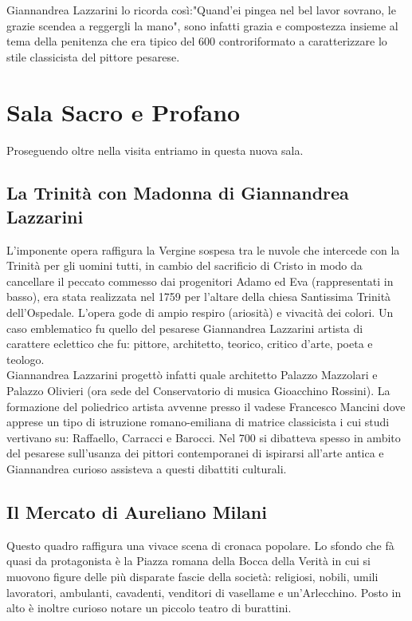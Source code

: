 \documentclass[hidelinks,12pt,a4paper]{article}
\begin{document}
\begin{flushleft}
		Giannandrea Lazzarini lo ricorda così:"Quand'ei pingea nel bel lavor sovrano, le grazie scendea a reggergli la mano", sono infatti grazia e compostezza insieme al tema della penitenza che era tipico del 600 controriformato a caratterizzare lo stile classicista del pittore pesarese.
		
		\section{Sala Sacro e Profano}
		Proseguendo oltre nella visita entriamo in questa nuova sala.
		
		\subsection{La Trinità con Madonna di Giannandrea Lazzarini}
		L'imponente opera raffigura la Vergine sospesa tra le nuvole che intercede con la Trinità per gli uomini tutti, in cambio del sacrificio di Cristo in modo da cancellare il peccato commesso dai progenitori Adamo ed Eva (rappresentati in basso), era stata realizzata nel 1759 per l'altare della chiesa Santissima Trinità dell'Ospedale. L'opera gode di ampio respiro (ariosità) e vivacità dei colori. Un caso emblematico fu quello del pesarese Giannandrea Lazzarini artista di carattere eclettico che fu: pittore, architetto, teorico, critico d'arte, poeta e teologo.\\
		Giannandrea Lazzarini progettò infatti quale architetto Palazzo Mazzolari e Palazzo Olivieri (ora sede del Conservatorio di musica Gioacchino Rossini). La formazione del poliedrico artista avvenne presso il vadese Francesco Mancini dove apprese un tipo di istruzione romano-emiliana di matrice classicista i cui studi vertivano su: Raffaello, Carracci e Barocci. Nel 700 si dibatteva spesso in ambito del pesarese sull'usanza dei pittori contemporanei di ispirarsi all'arte antica e Giannandrea curioso assisteva a questi dibattiti culturali.
		
		\subsection{Il Mercato di Aureliano Milani}
		Questo quadro raffigura una vivace scena di cronaca popolare. Lo sfondo che fà quasi da protagonista è la Piazza romana della Bocca della Verità in cui si muovono figure delle più disparate fascie della società: religiosi, nobili, umili lavoratori, ambulanti, cavadenti, venditori di vasellame e un'Arlecchino. Posto in alto è inoltre curioso notare un piccolo teatro di burattini.
		

\end{flushleft}
\end{document}
